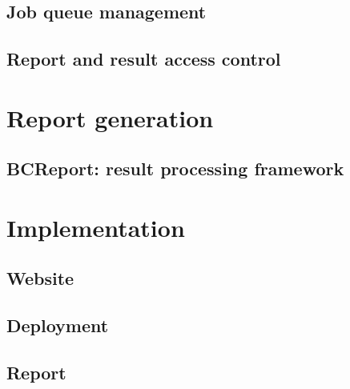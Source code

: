 \subsection{Job queue management}

\subsection{Report and result access control}

\section{Report generation}

\subsection{BCReport: result processing framework}

\section{Implementation}

\subsection{Website}

\subsection{Deployment}

\subsection{Report}
